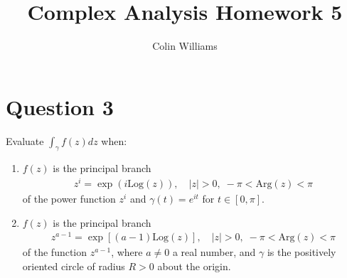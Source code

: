 \documentclass[10pt,a4paper]{article}
\title{Complex Analysis Homework 5}
\author{Colin Williams}
\theoremstyle{definition}
\begin{document}
\maketitle

\section*{Question 3}
Evaluate $\displaystyle \int_{\gamma}f(z)dz$ when:
\begin{enumerate}[label = (\alph*)]
\item $f(z)$ is the principal branch 
\begin{align*}
z^i = \exp(i \text{Log}(z)), \quad |z| > 0, \; -\pi < \text{Arg}(z) < \pi
\end{align*}
of the power function $z^i$ and $\gamma(t) = e^{it}$ for $t \in [0,\pi]$.
\item $f(z)$ is the principal branch
\begin{align*}
z^{a-1} = \exp[(a-1) \text{Log}(z)], \quad |z| > 0, \; -\pi < \text{Arg}(z) < \pi
\end{align*}
of the function $z^{a-1}$, where $a \neq 0$ a real number, and $\gamma$ is the positively oriented circle of radius $R > 0$ about the origin.
\end{enumerate}
\end{document}
